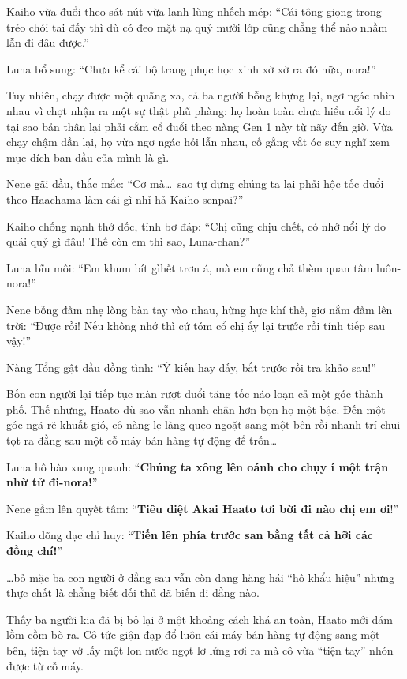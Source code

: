 \documentclass[../main.tex]{subfiles}
\begin{document}
Kaiho vừa đuổi theo sát nút vừa lạnh lùng nhếch mép: ``Cái tông giọng trong trẻo chói tai đấy thì dù có đeo mặt nạ quỷ mười lớp cũng chẳng thể nào nhầm lẫn đi đâu được.''

Luna bổ sung: ``Chưa kể cái bộ trang phục học xinh xờ xờ ra đó nữa, nora!''


Tuy nhiên, chạy được một quãng xa, cả ba người bỗng khựng lại, ngơ ngác nhìn nhau vì chợt nhận ra một sự thật phũ phàng: họ hoàn toàn chưa hiểu nổi lý do tại sao bản thân lại phải cắm cổ đuổi theo nàng Gen 1 này từ nãy đến giờ. Vừa chạy chậm dần lại, họ vừa ngơ ngác hỏi lẫn nhau, cố gắng vắt óc suy nghĩ xem mục đích ban đầu của mình là gì.

Nene gãi đầu, thắc mắc: ``Cơ mà\dots\ sao tự dưng chúng ta lại phải hộc tốc đuổi theo Haachama làm cái gì nhỉ hả Kaiho-senpai?''

Kaiho chống nạnh thở dốc, tỉnh bơ đáp: ``Chị cũng chịu chết, có nhớ nổi lý do quái quỷ gì đâu! Thế còn em thì sao, Luna-chan?''

Luna bĩu môi: ``Em khum bít gìhết trơn á, mà em cũng chả thèm quan tâm luôn-nora!''

Nene bỗng đấm nhẹ lòng bàn tay vào nhau, hừng hực khí thế, giơ nắm đấm lên trời: ``Được rồi! Nếu không nhớ thì cứ tóm cổ chị ấy lại trước rồi tính tiếp sau vậy!''

Nàng Tổng gật đầu đồng tình: ``Ý kiến hay đấy, bắt trước rồi tra khảo sau!''

Bốn con người lại tiếp tục màn rượt đuổi tăng tốc náo loạn cả một góc thành phố. Thế nhưng, Haato dù sao vẫn nhanh chân hơn bọn họ một bậc. Đến một góc ngã rẽ khuất gió, cô nàng lẹ làng quẹo ngoặt sang một bên rồi nhanh trí chui tọt ra đằng sau một cỗ máy bán hàng tự động để trốn\dots

Luna hô hào xung quanh: ``\textbf{Chúng ta xông lên oánh cho chụy í một trận nhừ tử đi-nora!}''

Nene gầm lên quyết tâm: ``\textbf{Tiêu diệt Akai Haato tơi bời đi nào chị em ơi}!''

Kaiho dõng dạc chỉ huy: ``T\textbf{iến lên phía trước san bằng tất cả hỡi các đồng chí!}''

\dots bỏ mặc ba con người ở đằng sau vẫn còn đang hăng hái ``hô khẩu hiệu'' nhưng thực chất là chẳng biết đối thủ đã biến đi đằng nào.

Thấy ba người kia đã bị bỏ lại ở một khoảng cách khá an toàn, Haato mới dám lồm cồm bò ra. Cô tức giận đạp đổ luôn cái máy bán hàng tự động sang một bên, tiện tay vớ lấy một lon nước ngọt lơ lửng rơi ra mà cô vừa ``tiện tay'' nhón được từ cỗ máy.
\end{document}
